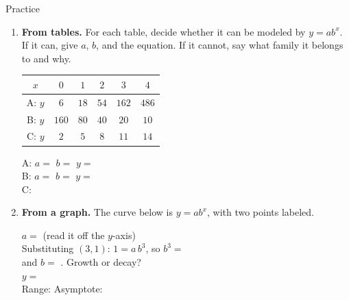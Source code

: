 \documentclass[10pt]{article}
\newcommand{\lgrid}[4]{%
  \draw[step=1, linegray!40, very thin] (#1,#3) grid (#2,#4);
  \draw[->, semithick, charcoal] (#1,0)--(#2,0) node[below right, font=\scriptsize]{$x$};
  \draw[->, semithick, charcoal] (0,#3)--(0,#4) node[left, font=\scriptsize]{$y$};}
\newcommand{\expcurve}[4]{\draw[very thick, forest, domain=#3:#4, samples=120, smooth]
  plot (\x,{#1*exp((#2)*(\x))});}
\begin{document}
\begin{notesbox}{Practice}
\begin{enumerate}[leftmargin=1.9em, itemsep=12pt]
  \item \textbf{From tables.} For each table, decide whether it can be modeled by $y=ab^{x}$. If it
    can, give $a$, $b$, and the equation. If it cannot, say what family it belongs to and why.
    \begin{center}
    \renewcommand{\arraystretch}{1.25}
    \begin{tabular}{|c|c|c|c|c|c|}
    \hline
    $x$ & $0$ & $1$ & $2$ & $3$ & $4$ \\ \hline
    A: $y$ & $6$ & $18$ & $54$ & $162$ & $486$ \\ \hline
    B: $y$ & $160$ & $80$ & $40$ & $20$ & $10$ \\ \hline
    C: $y$ & $2$ & $5$ & $8$ & $11$ & $14$ \\ \hline
    \end{tabular}
    \end{center}
    A: \; $a=$  \quad $b=$  \quad $y=$  \\[3pt]
    B: \; $a=$  \quad $b=$  \quad $y=$  \\[3pt]
    C: \; 

  \item \textbf{From a graph.} The curve below is $y=ab^{x}$, with two points labeled.
    \begin{center}
    \begin{minipage}[c]{0.42\linewidth}
    \centering
    \end{minipage}
    \begin{minipage}[c]{0.54\linewidth}
    $a=$  \; (read it off the $y$-axis) \\[6pt]
    Substituting $(3,1)$: \; $1=a\,b^{3}$, so $b^{3}=$  \\[6pt]
    and $b=$ . \quad Growth or decay?  \\[6pt]
    $y=$  \\[6pt]
    Range:  \quad Asymptote: 
    \end{minipage}
    \end{center}


\end{enumerate}
\end{notesbox}
\end{document}
